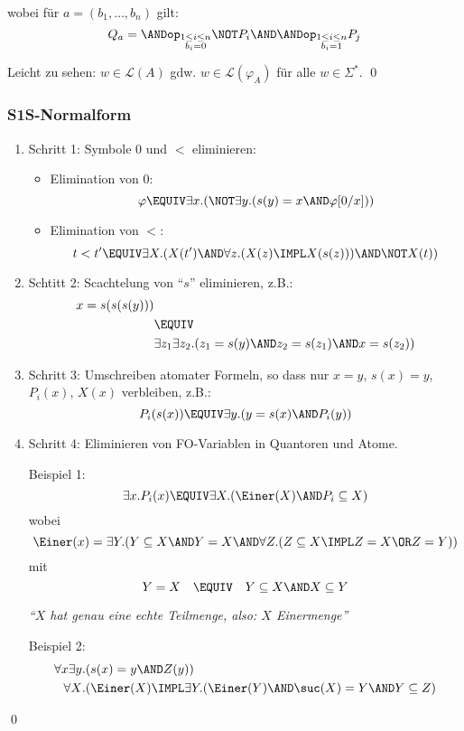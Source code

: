wobei für $a=(b_1,\dots,b_n)$ gilt:
\[
  Q_a = \ANDop_{\substack{1\leq i\leq n\\ b_i=0}} \NOT P_i \AND \ANDop_{\substack{1\leq i\leq n\\ b_i=1}} P_j
\]

Leicht zu sehen: $w\in\mathcal{L}(A)$ gdw. $w\in\mathcal{L}(\varphi_A)$ für alle $w\in\Sigma^*$.
\qed

\subsubsection{S1S-Normalform}

\begin{enumerate}
  \item Schritt 1: Symbole $0$ und $<$ eliminieren:
  \begin{itemize}
    \item Elimination von $0$:
    \[
      \varphi \EQUIV \exists x.(\NOT\exists y.(s(y)=x \AND \varphi[0/x]))
    \]
    \item Elimination von $<$:
    \[
      t<t' \EQUIV \exists X.(X(t') \AND \forall z.(X(z)\IMPL X(s(z))) \AND \NOT X(t))
    \]
  \end{itemize}
  \item Schtitt 2: Scachtelung von \enquote{$s$} eliminieren, z.B.:
  \begin{align*}
    x = s(s(s(y))) &\\
      & \EQUIV \\
      & \exists z_1\exists z_2.(z_1=s(y) \AND z_2=s(z_1) \AND x=s(z_2))
  \end{align*}
  \item Schritt 3: Umschreiben atomater Formeln, so dass nur $x=y$,
  $s(x)=y$, $P_i(x)$, $X(x)$ verbleiben, z.B.:
  \[
    P_i(s(x)) \EQUIV \exists y.(y=s(x) \AND P_i(y))
  \]
  \item Schritt 4: Eliminieren von FO-Variablen in Quantoren und Atome.
  
  Beispiel 1:
  \[
    \exists x.P_i(x) \EQUIV \exists X.(\Einer(X) \AND P_i\subseteq X)
  \]
  wobei
  \[
    \Einer(x) = \exists Y.(Y\subseteq X \AND Y=X \AND \forall Z.(Z\subseteq X \IMPL Z=X \OR Z=Y))
  \]
  mit
  \[
    Y=X \quad \EQUIV \quad Y\subseteq X \AND X\subseteq Y
  \]
  
  \strut\hfill\textit{\enquote{$X$ hat genau eine echte Teilmenge, also: $X$ Einermenge}}
  
  Beispiel 2:
  \begin{align*}
    \forall x\exists y&.(s(x)=y\AND Z(y)) \\
    \forall X&.(\Einer(X)\IMPL \exists Y.(\Einer(Y) \AND\suc(X) = Y \AND Y\subseteq Z)
  \end{align*}
\end{enumerate}
\qed

